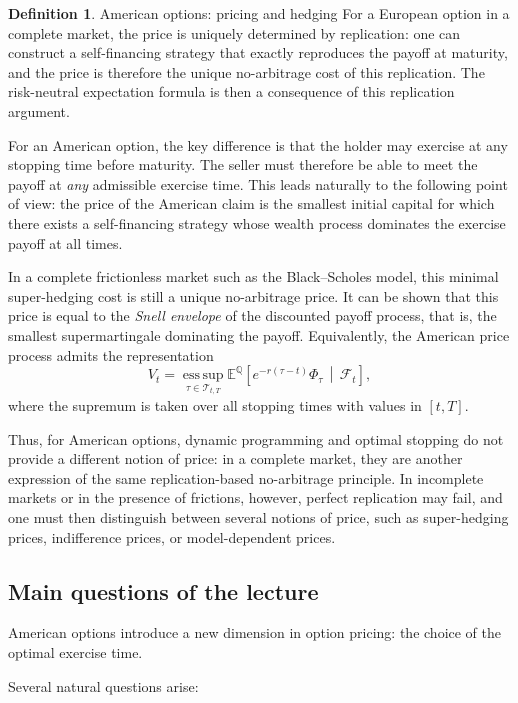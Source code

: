 \documentclass[11pt]{article}
\theoremstyle{definition}
\newtheorem{definition}{Definition}
\theoremstyle{plain}
\begin{document}
\begin{definition}{American options: pricing and hedging}
For a European option in a complete market, the price is uniquely determined by replication: one can construct a self-financing strategy that exactly reproduces the payoff at maturity, and the price is therefore the unique no-arbitrage cost of this replication. The risk-neutral expectation formula is then a consequence of this replication argument.

For an American option, the key difference is that the holder may exercise at any stopping time before maturity. The seller must therefore be able to meet the payoff at \emph{any} admissible exercise time. This leads naturally to the following point of view: the price of the American claim is the smallest initial capital for which there exists a self-financing strategy whose wealth process dominates the exercise payoff at all times.

In a complete frictionless market such as the Black--Scholes model, this minimal super-hedging cost is still a unique no-arbitrage price. It can be shown that this price is equal to the \emph{Snell envelope} of the discounted payoff process, that is, the smallest supermartingale dominating the payoff. Equivalently, the American price process admits the representation
\[
V_t
=
\operatorname*{ess\,sup}_{\tau \in \mathcal{T}_{t,T}}
\mathbb{E}^{\mathbb{Q}}
\!\left[
e^{-r(\tau-t)} \Phi_{\tau}
\,\middle|\,
\mathcal{F}_t
\right],
\]
where the supremum is taken over all stopping times with values in $[t,T]$.

Thus, for American options, dynamic programming and optimal stopping do not provide a different notion of price: in a complete market, they are another expression of the same replication-based no-arbitrage principle. In incomplete markets or in the presence of frictions, however, perfect replication may fail, and one must then distinguish between several notions of price, such as super-hedging prices, indifference prices, or model-dependent prices.
\end{definition}



\subsection{Main questions of the lecture}

American options introduce a new dimension in option pricing:
the choice of the optimal exercise time.

Several natural questions arise:
\end{document}
